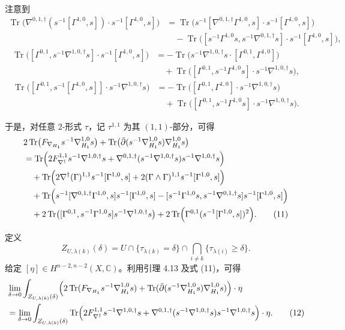 \documentclass[12pt,a4paper]{article}
\newcommand{\Tr}{\operatorname{Tr}}
\begin{document}
注意到
\begin{align}
\Tr\bigl(\nabla^{0,1,\dagger}(s^{-1}[\Gamma^{1,0},s])\cdot s^{-1}[\Gamma^{1,0},s]\bigr)
&=
\Tr\bigl(s^{-1}[\nabla^{0,1,\dagger}\Gamma^{1,0},s]\cdot s^{-1}[\Gamma^{1,0},s]\bigr)\nonumber\\
&\quad
-\Tr\bigl([s^{-1}\Gamma^{1,0}s,s^{-1}\nabla^{0,1,\dagger}s]\cdot s^{-1}[\Gamma^{1,0},s]\bigr), \tag{8}
\end{align}
\begin{align}
\Tr\bigl([\Gamma^{0,1},s^{-1}\nabla^{1,0,\dagger}s]\cdot s^{-1}[\Gamma^{1,0},s]\bigr)
&=
-\Tr\bigl(s^{-1}\nabla^{1,0,\dagger}s\cdot[\Gamma^{0,1},\Gamma^{1,0}]\bigr)\nonumber\\
&\quad
+\Tr\bigl([\Gamma^{0,1},s^{-1}\Gamma^{1,0}s]\cdot s^{-1}\nabla^{1,0,\dagger}s\bigr), \tag{9}
\end{align}
\begin{align}
\Tr\bigl([\Gamma^{0,1},s^{-1}[\Gamma^{1,0},s]]\cdot s^{-1}\nabla^{1,0,\dagger}s\bigr)
&=
-\Tr\bigl([\Gamma^{0,1},\Gamma^{1,0}]\cdot s^{-1}\nabla^{1,0,\dagger}s\bigr)\nonumber\\
&\quad
+\Tr\bigl([\Gamma^{0,1},s^{-1}\Gamma^{1,0}s]\cdot s^{-1}\nabla^{1,0,\dagger}s\bigr). \tag{10}
\end{align}

于是，对任意 2-形式 \(\tau\)，记 \(\tau^{1,1}\) 为其 \((1,1)\)-部分，可得
\begin{align}
&2\Tr\bigl(F_{\nabla_{H_1}}s^{-1}\nabla^{1,0}_{H_1}s\bigr)
+\Tr\bigl(\bar\partial(s^{-1}\nabla^{1,0}_{H_1}s)\nabla^{1,0}_{H_1}s\bigr)\nonumber\\
&=
\Tr\Bigl(
2F_{\nabla^\dagger}^{1,1}s^{-1}\nabla^{1,0,\dagger}s
+\nabla^{0,1,\dagger}(s^{-1}\nabla^{1,0,\dagger}s)s^{-1}\nabla^{1,0,\dagger}s
\Bigr)\nonumber\\
&\quad
+\Tr\Bigl(
2\nabla^\dagger(\Gamma)^{1,1}s^{-1}[\Gamma^{1,0},s]
+
2(\Gamma\wedge\Gamma)^{1,1}s^{-1}[\Gamma^{1,0},s]
\Bigr)\nonumber\\
&\quad
+\Tr\Bigl(
s^{-1}[\nabla^{0,1,\dagger}\Gamma^{1,0},s]s^{-1}[\Gamma^{1,0},s]
-
[s^{-1}\Gamma^{1,0}s,s^{-1}\nabla^{0,1,\dagger}s]s^{-1}[\Gamma^{1,0},s]
\Bigr)\nonumber\\
&\quad
+2\Tr\bigl([\Gamma^{0,1},s^{-1}\Gamma^{1,0}s]s^{-1}\nabla^{1,0,\dagger}s\bigr)
+2\Tr\Bigl(\Gamma^{0,1}(s^{-1}[\Gamma^{1,0},s])^2\Bigr). \tag{11}
\end{align}

定义
\[
Z_{U,\lambda(k)}(\delta)
=
U\cap \{\tau_{\lambda(k)}=\delta\}\cap \bigcap_{i\ne k}\{\tau_{\lambda(i)}\ge \delta\}.
\]
给定 \([\eta]\in H^{n-2,n-2}(X,\mathbb C)\)。利用引理 4.13 及式 (11)，可得
\begin{align}
&\lim_{\delta\to 0}
\int_{Z_{U,\lambda(k)}(\delta)}
\Bigl(
2\Tr(F_{\nabla_{H_1}}s^{-1}\nabla^{1,0}_{H_1}s)
+
\Tr(\bar\partial(s^{-1}\nabla^{1,0}_{H_1}s)\nabla^{1,0}_{H_1}s)
\Bigr)\cdot \eta
\nonumber\\
&=
\lim_{\delta\to 0}
\int_{Z_{U,\lambda(k)}(\delta)}
\Tr\Bigl(
2F_{\nabla^\dagger}^{1,1}s^{-1}\nabla^{1,0,\dagger}s
+
\nabla^{0,1,\dagger}(s^{-1}\nabla^{1,0,\dagger}s)s^{-1}\nabla^{1,0,\dagger}s
\Bigr)\cdot \eta. \tag{12}
\end{align}
\end{document}
